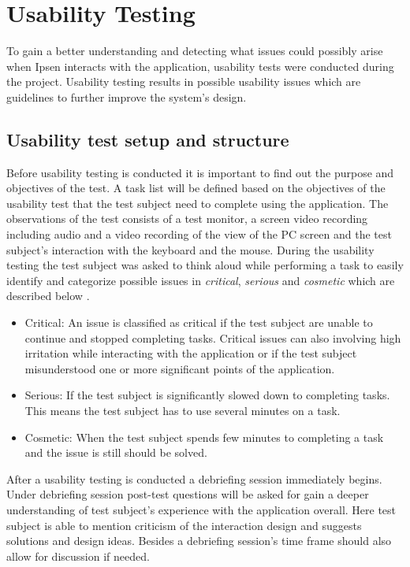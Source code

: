 \section{Usability Testing}

To gain a better understanding and detecting what issues could possibly arise when Ipsen interacts with the application, usability tests were conducted during the project. 
Usability testing results in possible usability issues which are guidelines to further improve the system's design. 

\subsection{Usability test setup and structure}
Before usability testing is conducted it is important to find out the purpose and objectives of the test. 
A task list will be defined based on the objectives of the usability test that the test subject need to complete using the application. The observations of the test consists of a test monitor, a screen video recording including audio and a video recording of the view of the PC screen and the test subject's interaction with the keyboard and the mouse. 
During the usability testing the test subject was asked to think aloud while performing a task to easily identify and categorize possible issues in \textit{critical}, \textit{serious} and \textit{cosmetic} which are described below \citep[p.~154]{brugervenligtwebdesign}.

\begin{itemize}
  \item Critical: An issue is classified as critical if the test subject are unable to continue and stopped completing tasks.
Critical issues can also involving high irritation while interacting with the application or if the test subject misunderstood one or more significant points of the application.
  \item Serious: If the test subject is significantly slowed down to completing tasks. 
This means the test subject has to use several minutes on a task.
	\item Cosmetic: When the test subject spends few minutes to completing a task and the issue is still should be solved. 
\end{itemize}

After a usability testing is conducted a debriefing session immediately  begins. 
Under debriefing session post-test questions will be asked for gain a deeper understanding of test subject's experience with the application overall. 
Here test subject is able to mention criticism of the interaction design and suggests solutions and design ideas. 
Besides a debriefing session's time frame should also allow for discussion if needed. 

